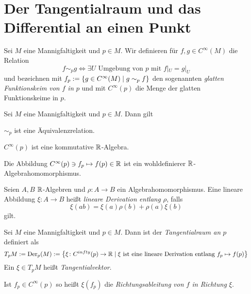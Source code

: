 \section{Der Tangentialraum und das Differential an einen
  Punkt}
\label{sec:tpm}

\begin{definition}
  Sei $M$ eine Mannigfaltigkeit und $p\in M$. Wir definieren für $f,g
  \in C^\infty(M)$ die Relation
  \begin{equation*}
    f \sim_p g \iff \exists U\text{ Umgebung von $p$ mit } f|_U = g|_U
  \end{equation*}
  und bezeichnen mit $f_p := \left\lbrace g\in C^\infty(M) \mid g\sim_p f \right\rbrace$
  den sogenannten \emph{glatten Funktionskeim von $f$ in $p$} und mit
  $C^\infty(p)$ die Menge der glatten Funktionskeime in $p$.
\end{definition}

\begin{proposition}
  Sei $M$ eine Mannigfaltigkeit und $p\in M$. Dann gilt
  \begin{statements}
  \item $\sim_p$ ist eine Äquivalenzrelation.
  \item $C^\infty(p)$ ist eine kommutative $\mathbb{R}$-Algebra.
  \item Die Abbildung $C^\infty(p) \ni f_p \mapsto f(p) \in \mathbb{R}$ ist
    ein wohldefinierer $\mathbb{R}$-Algebrahomomorphismus. 
  \end{statements}
\end{proposition}

\begin{definition}
  Seien $A,B$ $\mathbb{R}$-Algebren und $\rho \colon A \to B$ ein
  Algebrahomomorphismus. Eine lineare Abbildung $\xi \colon A \to B$
  heißt \emph{lineare Derivation entlang $\rho$}, falls
  \begin{equation*}
    \xi(ab) = \xi(a)\rho(b) + \rho(a)\xi(b)
  \end{equation*}
  gilt.
\end{definition}

\begin{definition}
  Sei $M$ eine Mannigfaltigkeit und $p\in M$. Dann ist der
  \emph{Tangentialraum an $p$} definiert als
  \begin{equation*}
    T_pM := \operatorname{Der}_p(M) := \left\lbrace  \xi \colon C^{infty}(p) \to \mathbb{R}\mid
      \xi\text{ ist eine lineare Derivation entlang $f_p \mapsto f(p)$} \right\rbrace
  \end{equation*}
  Ein $\xi \in T_pM$ heißt \emph{Tangentialvektor}.

  Ist $f_p\in C^\infty(p)$ so heißt $\xi(f_p)$ die
  \emph{Richtungsableitung von $f$ in Richtung $\xi$}.
\end{definition}

